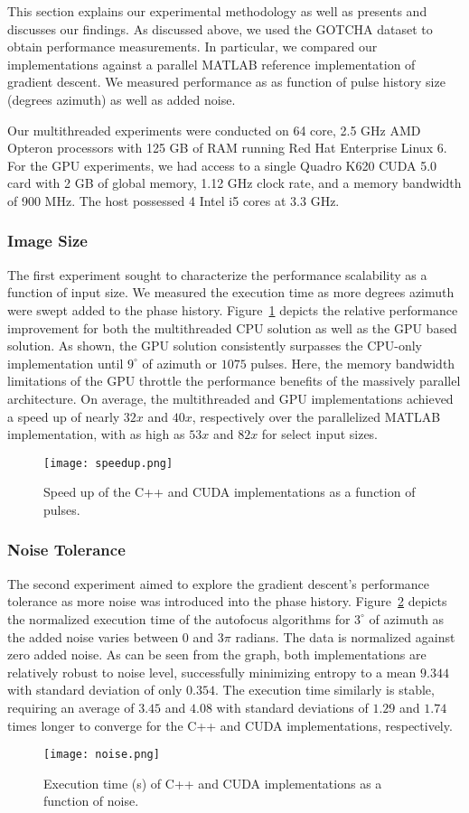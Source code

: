 This section explains our experimental methodology as well as presents and
discusses our findings. As discussed above, we used the GOTCHA dataset to
obtain performance measurements. In particular, we compared our implementations
against a parallel MATLAB reference implementation of gradient descent. We
measured performance as as function of pulse history size (degrees azimuth) as
well as added noise.

Our multithreaded experiments were conducted on 64 core, 2.5 GHz AMD Opteron
processors with 125 GB of RAM running Red Hat Enterprise Linux 6. For the GPU
experiments, we had access to a single Quadro K620 CUDA 5.0 card with 2 GB of
global memory, 1.12 GHz clock rate, and a memory bandwidth of 900 MHz. The host
possessed 4 Intel i5 cores at 3.3 GHz.

\subsubsection{Image Size}

The first experiment sought to characterize the performance scalability as a
function of input size. We measured the execution time as more degrees azimuth
were swept added to the phase history. Figure~\ref{fig:speedup} depicts the
relative performance improvement for both the multithreaded CPU solution as well
as the GPU based solution. As shown, the GPU solution consistently surpasses the
CPU-only implementation until $9^{\circ}$ of azimuth or $1075$ pulses. Here, the
memory bandwidth limitations of the GPU throttle the performance benefits of the
massively parallel architecture. On average, the multithreaded and GPU
implementations achieved a speed up of nearly $32x$ and $40x$, respectively over
the parallelized MATLAB implementation, with as high as $53x$ and $82x$ for select
input sizes.

\begin{figure}
  \centering
  \texttt{[image: speedup.png]}
  \vspace{5 mm}
  \caption{Speed up of the C++ and CUDA implementations as a function of pulses.}
  \label{fig:speedup}
\end{figure}

\subsubsection{Noise Tolerance}

The second experiment aimed to explore the gradient descent's performance
tolerance as more noise was introduced into the phase history.
Figure~\ref{fig:noise} depicts the normalized execution time of the
autofocus algorithms for $3^{\circ}$ of azimuth as the added noise varies
between $0$ and $3\pi$ radians. The data is normalized against zero added noise.
As can be seen from the graph, both implementations are relatively robust to
noise level, successfully minimizing entropy to a mean $9.344$ with standard
deviation of only $0.354$. The execution time similarly is stable, requiring an
average of $3.45$ and $4.08$ with standard deviations of $1.29$ and $1.74$ times
longer to converge for the C++ and CUDA implementations, respectively.

\begin{figure}
  \centering
  \texttt{[image: noise.png]}
  \vspace{5 mm}
  \caption{Execution time (s) of C++ and CUDA implementations as a function of
  noise.}
  \label{fig:noise}
\end{figure}
